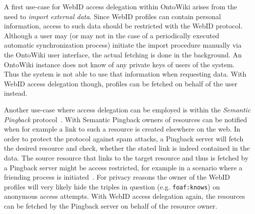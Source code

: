 \documentclass[a4paper]{llncs}
\begin{document}

A first use-case for WebID access delegation within OntoWiki arises from the need to \textit{import external data}.
Since WebID profiles can contain personal information, access to such data should be restricted with the WebID protocol.
Although a user may (or may not in the case of a periodically executed automatic synchronization process) initiate the import procedure manually via the OntoWiki user interface, the actual fetching is done in the background.
An OntoWiki instance does not know of any private keys of users of the system.
Thus the system is not able to use that information when requesting data.
With WebID access delegation though, profiles can be fetched on behalf of the user instead.

Another use-case where access delegation can be employed is within the \textit{Semantic Pingback} protocol~\cite{tramp-s-2010--b}.
With Semantic Pingback owners of resources can be notified when for example a link to such a resource is created elsewhere on the web.
In order to protect the protocol against spam attacks, a Pingback server will fetch the desired resource and check, whether the stated link is indeed contained in the data.
The source resource that links to the target resource and thus is fetched by a Pingback server might be access restricted, for example in a scenario where a friending process is initiated~\cite{story-h-2011--a}.
For privacy reasons the owner of the WebID profiles will very likely hide the triples in question (e.g. \texttt{foaf:knows}) on anonymous access attempts.
With WebID access delegation again, the resources can be fetched by the Pingback server on behalf of the resource owner.
\end{document}
